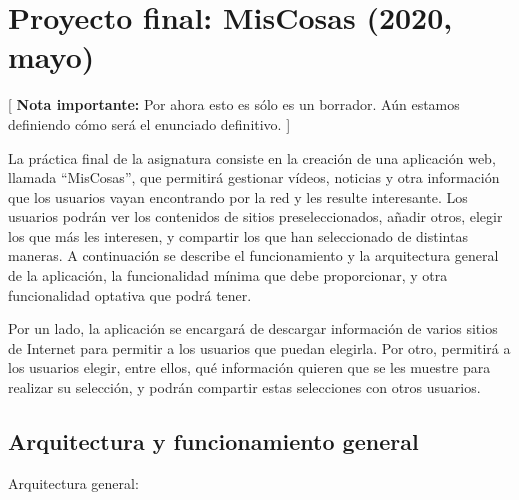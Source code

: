 \section{Proyecto final: MisCosas (2020, mayo)}
\label{practica-final-2020-05}

[ \textbf{Nota importante:} Por ahora esto es sólo es un borrador. Aún estamos definiendo cómo será el enunciado definitivo. ]

La práctica final de la asignatura consiste en la creación de una aplicación web, llamada ``MisCosas'', que permitirá gestionar vídeos, noticias y otra información que los usuarios vayan encontrando por la red y les resulte interesante. Los usuarios podrán ver los contenidos de sitios preseleccionados, añadir otros, elegir los que más les interesen, y compartir los que han seleccionado de distintas maneras. A continuación se describe el funcionamiento y la arquitectura general de la aplicación, la funcionalidad mínima que debe proporcionar, y otra funcionalidad optativa que podrá tener.

Por un lado, la aplicación se encargará de descargar información de varios sitios de Internet para permitir a los usuarios que puedan elegirla. Por otro, permitirá a los usuarios elegir, entre ellos, qué información quieren que se les muestre para realizar su selección, y podrán compartir estas selecciones con otros usuarios.

\subsection{Arquitectura y funcionamiento general}

Arquitectura general:


